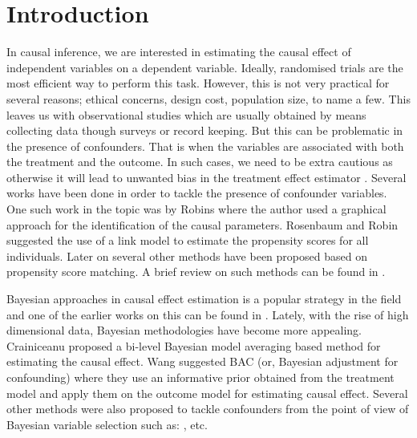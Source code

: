 \documentclass[oribibl]{llncs}
\begin{document}
\section{Introduction}\label{sec:intro}

In causal inference, we are interested in estimating the causal
effect of independent variables on a dependent variable. Ideally,
randomised trials are the most efficient way to perform this task.
However, this is not very practical for several reasons; ethical 
concerns, design cost, population size, to name a few. This
leaves us with observational studies which are usually obtained
by means collecting data though surveys or record keeping. But this
can be problematic in the presence of confounders. That is when
the variables are associated with both the treatment and the outcome.
In such cases, we need to be extra cautious as otherwise it will
lead to unwanted bias in the treatment effect estimator \cite{rosenbaum83}.
Several works have been done in order to tackle the presence of
confounder variables. One such work in the topic was 
by Robins \cite{Robins1986ANA} where the author used  a graphical
approach for the identification of the causal parameters.
Rosenbaum and Robin \cite{rosenbaum1985} suggested the use of a link model to estimate
the propensity scores for all individuals. Later on several other
methods have been proposed based on propensity score matching.
A brief review on such methods can be found in \cite{winship99, stuart10}.

Bayesian approaches in causal effect estimation is a popular
strategy in the field and one of the earlier works on this can be
found in \cite{rubin1978}. Lately, with the rise of high dimensional 
data, Bayesian methodologies have become
more appealing. Crainiceanu \cite{Crainiceanu2008} proposed a bi-level 
Bayesian model averaging based method for estimating the causal 
effect. Wang \cite{wang2015} suggested BAC (or, Bayesian adjustment for
confounding) where they use an informative prior obtained from
the treatment model and apply them on the outcome model for
estimating causal effect. Several other methods were also
proposed to tackle confounders from the point of view of Bayesian
variable selection such as: \cite{Zigler2014}, \cite{Hahn2018} etc.
\end{document}
